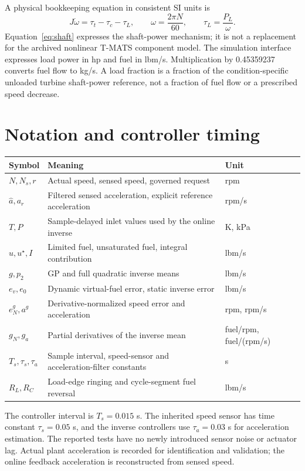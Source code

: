 \documentclass[11pt,a4paper,oneside]{report}
\begin{document}
A physical bookkeeping equation in consistent SI units is
\begin{equation}
J\dot\omega=\tau_t-\tau_c-\tau_L,\qquad \omega=\frac{2\pi N}{60},\qquad \tau_L=\frac{P_L}{\omega}.
\label{eq:shaft}
\end{equation}
Equation~\eqref{eq:shaft} expresses the shaft-power mechanism; it is not a replacement for the archived nonlinear T-MATS component model. The simulation interface expresses load power in hp and fuel in lbm/s. Multiplication by 0.45359237 converts fuel flow to kg/s. A load fraction is a fraction of the condition-specific unloaded turbine shaft-power reference, not a fraction of fuel flow or a prescribed speed decrease.

\section{Notation and controller timing}
\begin{longtable}{@{}p{.16\linewidth}p{.54\linewidth}p{.23\linewidth}@{}}
\toprule Symbol & Meaning & Unit\\\midrule
$N,N_s,r$ & Actual speed, sensed speed, governed request & rpm\\
$\hat a,a_r$ & Filtered sensed acceleration, explicit reference acceleration & rpm/s\\
$T,P$ & Sample-delayed inlet values used by the online inverse & K, kPa\\
$u,u^\star,I$ & Limited fuel, unsaturated fuel, integral contribution & lbm/s\\
$g,p_2$ & GP and full quadratic inverse means & lbm/s\\
$e_v,e_0$ & Dynamic virtual-fuel error, static inverse error & lbm/s\\
$e_N^g,a^g$ & Derivative-normalized speed error and acceleration & rpm, rpm/s\\
$g_N,g_a$ & Partial derivatives of the inverse mean & fuel/rpm, fuel/(rpm/s)\\
$T_s,\tau_s,\tau_a$ & Sample interval, speed-sensor and acceleration-filter constants & s\\
$R_L,R_C$ & Load-edge ringing and cycle-segment fuel reversal & lbm/s\\
\bottomrule
\end{longtable}
The controller interval is $T_s=0.015$ s. The inherited speed sensor has time constant $\tau_s=0.05$ s, and the inverse controllers use $\tau_a=0.03$ s for acceleration estimation. The reported tests have no newly introduced sensor noise or actuator lag. Actual plant acceleration is recorded for identification and validation; the online feedback acceleration is reconstructed from sensed speed.
\end{document}
